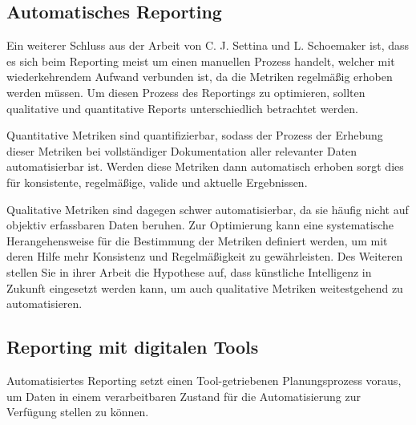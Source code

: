 
\subsection{Automatisches Reporting}
Ein weiterer Schluss aus der Arbeit von C. J. Settina und L. Schoemaker \cite{reportingInAgilePortfoliomanagement} ist, dass es sich beim Reporting meist um einen manuellen Prozess handelt, welcher mit wiederkehrendem Aufwand verbunden ist, da die Metriken regelmäßig erhoben werden müssen. Um diesen Prozess des Reportings zu optimieren, sollten qualitative und quantitative Reports unterschiedlich betrachtet werden.

Quantitative Metriken sind quantifizierbar, sodass der Prozess der Erhebung dieser Metriken bei vollständiger Dokumentation aller relevanter Daten automatisierbar ist. Werden diese Metriken dann automatisch erhoben sorgt dies für konsistente, regelmäßige, valide und aktuelle Ergebnissen.

Qualitative Metriken sind dagegen schwer automatisierbar, da sie häufig nicht auf objektiv erfassbaren Daten beruhen. Zur Optimierung kann eine systematische Herangehensweise für die Bestimmung der Metriken definiert werden, um mit deren Hilfe  mehr Konsistenz und Regelmäßigkeit zu gewährleisten. Des Weiteren stellen Sie in ihrer Arbeit die Hypothese auf, dass künstliche Intelligenz in Zukunft eingesetzt werden kann, um auch qualitative Metriken weitestgehend zu automatisieren.

\subsection{Reporting mit digitalen Tools}
Automatisiertes Reporting setzt einen Tool-getriebenen Planungsprozess voraus, um Daten in einem verarbeitbaren Zustand für die Automatisierung zur Verfügung stellen zu können.

